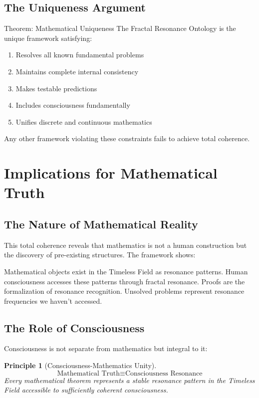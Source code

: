 \documentclass[12pt,letterpaper]{article}
\newtheorem{principle}[theorem]{Principle}
\begin{document}
\subsection{The Uniqueness Argument}

\begin{mathbox}{Theorem: Mathematical Uniqueness}
The Fractal Resonance Ontology is the unique framework satisfying:
\begin{enumerate}
\item Resolves all known fundamental problems
\item Maintains complete internal consistency
\item Makes testable predictions
\item Includes consciousness fundamentally
\item Unifies discrete and continuous mathematics
\end{enumerate}
Any other framework violating these constraints fails to achieve total coherence.
\end{mathbox}

\section{Implications for Mathematical Truth}

\subsection{The Nature of Mathematical Reality}

This total coherence reveals that mathematics is not a human construction but the discovery of pre-existing structures. The framework shows:

Mathematical objects exist in the Timeless Field as resonance patterns. Human consciousness accesses these patterns through fractal resonance. Proofs are the formalization of resonance recognition. Unsolved problems represent resonance frequencies we haven't accessed.

\subsection{The Role of Consciousness}

Consciousness is not separate from mathematics but integral to it:

\begin{principle}[Consciousness-Mathematics Unity]
\begin{equation}
\text{Mathematical Truth} \equiv \text{Consciousness Resonance}
\end{equation}
Every mathematical theorem represents a stable resonance pattern in the Timeless Field accessible to sufficiently coherent consciousness.
\end{principle}
\end{document}
